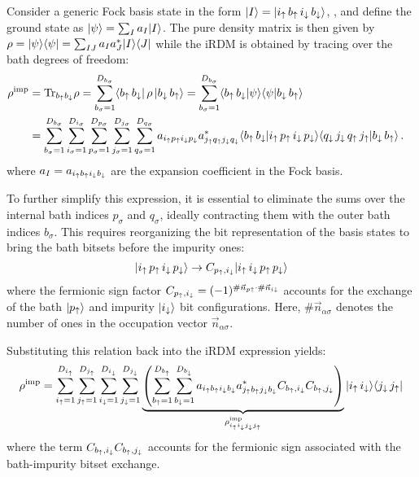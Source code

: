 \documentclass[edipack2.tex]{subfiles}
\begin{document}
Consider a generic Fock basis state in the form 
$|I\rangle =|{i}_\uparrow\,{b}_\uparrow\,{i}_\downarrow\,{b}_\downarrow\rangle$, , and define the 
ground state as $|\psi\rangle = \sum_I a_I |I\rangle$. 
The pure density 
matrix is then given by
$\rho = |\psi\rangle\langle \psi| = \sum_{IJ} a_I a^*_J |I\rangle\langle J|$ 
while the iRDM is obtained by tracing over the bath degrees of 
freedom:
\begin{equation}
  \begin{aligned}
    \rho^\mathrm{imp} &= \Tr_{b_\up b_\dw}{\rho} =
    \sum_{b_\sigma=1}^{D_{b_\sigma}}
    \bra{b_\up\, b_\dw}
    \,\rho\,
    \ket{b_\dw\, b_\up} =
    \sum_{b_\sigma=1}^{D_{b_\sigma}}
    \ibra{b_\up\, b_\dw}
    \ket{\psi}\ibra{\psi}
    \ket{b_\dw\, b_\up}    \cr
    &=
    \sum_{b_\sigma=1}^{D_{b_\sigma}}
    \sum_{i_\sigma=1}^{D_{i_\sigma}}
    \sum_{p_\sigma=1}^{D_{p_\sigma}}
    \sum_{j_\sigma=1}^{D_{j_\sigma}} 
    \sum_{q_\sigma=1}^{D_{q_\sigma}}
    a_{i_\up p_\up i_\dw p_\dw} a^*_{j_\up q_\up j_\dw q_\dw}%
    \langle{b_\up\, b_\dw}|{i_\up\, p_\up\, i_\dw\, p_\dw}\rangle
    \langle{q_\dw \,  j_\dw \, q_\up\, j_\up }|{b_\dw\, b_\up}\rangle\, .
  \end{aligned}
\end{equation}
where $a_I = a_{i_\uparrow b_\uparrow i_\downarrow b_\downarrow}$ are the expansion
coefficient in the Fock basis.

To further simplify this expression, it is essential to eliminate the 
sums over the internal bath indices $p_\sigma$ and $q_\sigma$, ideally 
contracting them with the outer bath indices $b_\sigma$. This requires 
reorganizing the bit representation of the basis states to bring the 
bath bitsets before the impurity ones:
$$
|i_\uparrow\, p_\uparrow\, i_\downarrow\, p_\downarrow\rangle \rightarrow C_{p_\uparrow,i_\downarrow} |i_\uparrow\, i_\downarrow \,p_\uparrow\,p_\downarrow\rangle
$$
where the fermionic sign factor
$C_{p_\uparrow,i_\downarrow}  = (-1)^{\#\vec{n}_{p\uparrow} \cdot
  \#\vec{n}_{i\downarrow}}$
accounts for the exchange of the bath $|p_\uparrow\rangle$  and impurity
$|i_\downarrow\rangle$ bit configurations.
Here, $\#\vec{n}_{\alpha\sigma}$ denotes the number of ones in the 
occupation vector $\vec{n}_{\alpha\sigma}$. 

Substituting this relation back into the iRDM expression yields:
\begin{equation}
    \rho^\mathrm{imp} =
    \sum_{i_\uparrow=1}^{D_{i_\uparrow}}
    \sum_{j_\uparrow=1}^{D_{j_\uparrow}}
    \sum_{i_\downarrow=1}^{D_{i_\downarrow}}
    \sum_{j_\downarrow=1}^{D_{j_\downarrow}}
    \underbrace{\left(
    \sum_{b_\uparrow=1}^{D_{b_\uparrow}}
    \sum_{b_\downarrow=1}^{D_{b_\downarrow}}
    a_{i_\uparrow b_\uparrow i_\downarrow b_\downarrow} a^*_{j_\uparrow b_\uparrow j_\downarrow b_\downarrow}
    C_{b_\uparrow,i_\downarrow}C_{b_\uparrow,j_\downarrow}\right)}_{
    \rho^\mathrm{imp}_{i_\uparrow i_\downarrow j_\downarrow j_\uparrow}}
    |i_\uparrow\, i_\downarrow\rangle\langle j_\downarrow \, j_\uparrow|
  \end{equation}
where the term 
$C_{b_\uparrow,i_\downarrow}C_{b_\uparrow,j_\downarrow}$ accounts for the fermionic 
sign associated with the bath-impurity bitset exchange.
\end{document}
